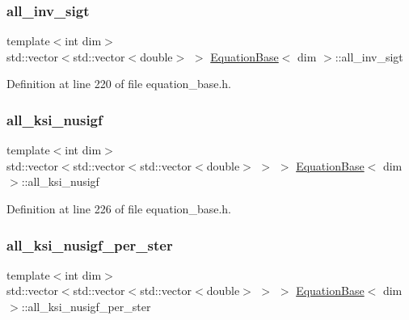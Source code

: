 \subsubsection{\texorpdfstring{all\+\_\+inv\+\_\+sigt}{all\_inv\_sigt}}
{\footnotesize\ttfamily template$<$int dim$>$ \\
std\+::vector$<$std\+::vector$<$double$>$ $>$ \hyperlink{class_equation_base}{Equation\+Base}$<$ dim $>$\+::all\+\_\+inv\+\_\+sigt\hspace{0.3cm}{\ttfamily [protected]}}



Definition at line 220 of file equation\+\_\+base.\+h.

\mbox{\label{class_equation_base_a6dd0c8e99876686f8b6310dd3c914966}} 
\subsubsection{\texorpdfstring{all\+\_\+ksi\+\_\+nusigf}{all\_ksi\_nusigf}}
{\footnotesize\ttfamily template$<$int dim$>$ \\
std\+::vector$<$std\+::vector$<$std\+::vector$<$double$>$ $>$ $>$ \hyperlink{class_equation_base}{Equation\+Base}$<$ dim $>$\+::all\+\_\+ksi\+\_\+nusigf\hspace{0.3cm}{\ttfamily [protected]}}



Definition at line 226 of file equation\+\_\+base.\+h.

\mbox{\label{class_equation_base_aa9d38817ca8b3d8c5bc577c7010473d0}} 
\subsubsection{\texorpdfstring{all\+\_\+ksi\+\_\+nusigf\+\_\+per\+\_\+ster}{all\_ksi\_nusigf\_per\_ster}}
{\footnotesize\ttfamily template$<$int dim$>$ \\
std\+::vector$<$std\+::vector$<$std\+::vector$<$double$>$ $>$ $>$ \hyperlink{class_equation_base}{Equation\+Base}$<$ dim $>$\+::all\+\_\+ksi\+\_\+nusigf\+\_\+per\+\_\+ster\hspace{0.3cm}{\ttfamily [protected]}}



